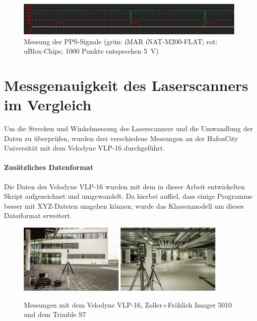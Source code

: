 \documentclass[a4paper,12pt,bibliography=totoc, listof=totoc,titlepage,pointlessnumbers]{scrreprt}
\begin{document}
\begin{figure}
 \centering
 \includegraphics[width=1\textwidth]{./img/osziPPS.png}
 \caption{Messung der PPS-Signale (grün: iMAR iNAT-M200-FLAT; rot: uBlox-Chips; 1000 Punkte entsprechen 5~V)}
 \label{img:osPPS}
\end{figure}

\section{Messgenauigkeit des Laser\-scan\-ners im Vergleich}
Um die Strecken und Winkelmessung des Laser\-scan\-ners und die Umwandlung der Daten zu überprüfen, wurden drei verschiedene Messungen an der HafenCity Universität mit dem Velodyne VLP-16 durchgeführt. 

\paragraph{Zu\-sätz\-liches Datenformat}
Die Daten des Velodyne VLP-16 wurden mit dem in dieser Arbeit entwickelten Skript aufgezeichnet und umgewandelt. Da hierbei auffiel, dass einige Programme besser mit XYZ-Dateien umgehen können, wurde das Klassenmodell um dieses Dateiformat erweitert.

\begin{figure}
 \centering
 \includegraphics[width=0.45\textwidth]{./img/fassade.jpg}
 \includegraphics[width=0.45\textwidth]{./img/tiefgarage.jpg}
 \caption{Messungen mit dem Velodyne VLP-16, Zoller+Fröhlich Imager 5010 und dem Trimble S7}
 \label{img:messbilder}
\end{figure}
\end{document}
